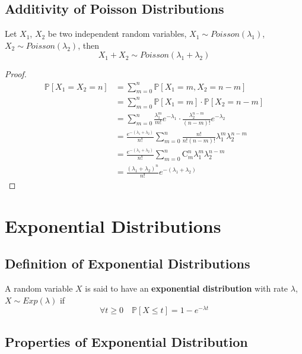     \subsection{Additivity of Poisson Distributions}
    \begin{theorem}
        Let $X_1$, $X_2$ be two independent random variables, $X_1\sim Poisson(\lambda_1)$, $X_2\sim Poisson(\lambda_2)$, then
        \[ X_1 + X_2 \sim Poisson(\lambda_1 + \lambda_2) \]
    \end{theorem}
    \begin{proof}
        \begin{align*}
            \mathbb{P}[X_1=X_2=n] &=\sum_{m=0}^n \mathbb{P}[X_1=m, X_2=n-m]\\
            &= \sum_{m=0}^n\mathbb{P}[X_1=m]\cdot\mathbb{P}[X_2=n-m]\\
            &= \sum_{m=0}^n\frac{\lambda_1^m}{m!}e^{-\lambda_1}\cdot\frac{\lambda_2^{n-m}}{(n-m)!}e^{-\lambda_2}\\
            &= \frac{e^{-(\lambda_1+\lambda_2)}}{n!}\sum_{m=0}^n\frac{n!}{n!(n-m)!}\lambda_1^m\lambda_2^{n-m}\\
            &= \frac{e^{-(\lambda_1+\lambda_2)}}{n!}\sum_{m=0}^n\mathrm{C}_m^n \lambda_1^m \lambda_2^{n-m}\\
            &= \frac{(\lambda_1+\lambda_2)^n}{n!}e^{-(\lambda_1+\lambda_2)}
        \end{align*}
    \end{proof}


\section{Exponential Distributions}

    \subsection{Definition of Exponential Distributions}
    \begin{definition}
        A random variable $X$ is said to have an \textbf{exponential distribution} with rate $\lambda$, $X \sim Exp(\lambda)$ if
        \[ \forall t \ge 0 \quad \mathbb{P}[X \le t] = 1 - e^{-\lambda t} \]
    \end{definition}

    \subsection{Properties of Exponential Distribution}

